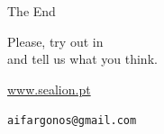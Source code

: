 \documentclass[trans,draft]{beamer} %
\begin{document}
\begin{frame}{The End}

	\begin{center}

		\vspace{5pt}

		Please, try out  in \\
		and tell us what you think.

		\vspace{5pt}

		\url{www.sealion.pt}\\

		\vspace{5pt}

		\texttt{aifargonos@gmail.com}
	\end{center}
%
%
%
%
%
%
%

\end{frame}
\end{document}
